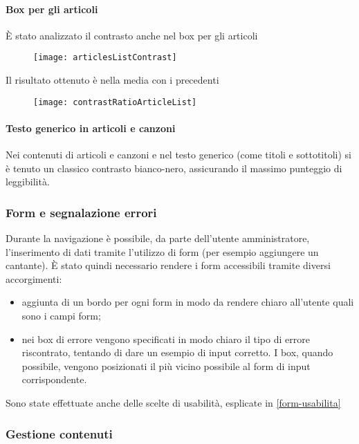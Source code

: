 \paragraph{Box per gli articoli}È stato analizzato il contrasto anche nel box per gli articoli
\begin{figure}[H]

    \centering
    \texttt{[image: articlesListContrast]}

\end{figure}

Il risultato ottenuto è nella media con i precedenti
\begin{figure}[H]

    \centering
    \texttt{[image: contrastRatioArticleList]}

\end{figure}

\paragraph*{Testo generico in articoli e canzoni}Nei contenuti di articoli e canzoni e nel testo generico (come titoli e sottotitoli) si è tenuto un classico contrasto bianco-nero, assicurando il massimo punteggio di leggibilità.

\subsubsection{Form e segnalazione errori}
\label{form-accessibilita}
Durante la navigazione è possibile, da parte dell'utente amministratore, l'inserimento di dati tramite l'utilizzo di form (per esempio aggiungere un cantante). È stato quindi necessario rendere i form accessibili tramite diversi accorgimenti:
\begin{itemize}

    \item aggiunta di un bordo per ogni form in modo da rendere chiaro all'utente quali sono i campi form;
    \item nei box di errore vengono specificati in modo chiaro il tipo di errore riscontrato, tentando di dare un esempio di input corretto. I box, quando possibile, vengono posizionati il più vicino possibile al form di input corrispondente.

\end{itemize}
Sono state effettuate anche delle scelte di usabilità, esplicate in \ref{form-usabilita}

\subsubsection{Gestione contenuti}

